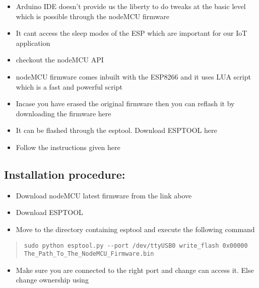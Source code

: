 \documentclass[16pt]{article}
\begin{document}
\begin{itemize}

\item
  Arduino IDE doesn't provide us the liberty to do tweaks at the basic
  level which is possible through the nodeMCU firmware
\item
  It cant access the sleep modes of the ESP which are important for our
  IoT application
\item
  checkout the nodeMCU API
\item
  nodeMCU firmware comes inbuilt with the ESP8266 and it uses LUA script
  which is a fast and powerful script
\item
  Incase you have erased the original firmware then you can reflash it
  by downloading the firmware here
\item
  It can be flashed through the esptool. Download ESPTOOL here
\item
  Follow the instructions given here
 
\end{itemize}

\subsection{Installation procedure:}

\begin{itemize}

\item
  Download nodeMCU latest firmware from the link above
\item
  Download ESPTOOL
\item
  Move to the directory containing esptool and execute the following
  command
\end{itemize}

\begin{quote}
\texttt{sudo python esptool.py -{}-port /dev/ttyUSB0  write\_flash 0x00000 The\_Path\_To\_The\_NodeMCU\_Firmware.bin}
\end{quote}

\begin{itemize}

\item
  Make sure you are connected to the right port and change can access
  it. Else change ownership using
\end{itemize}
\end{document}
